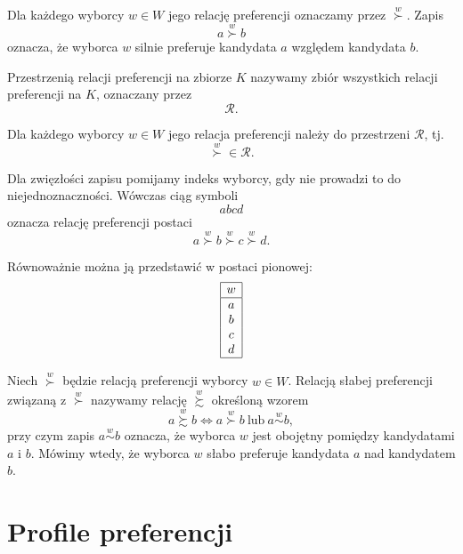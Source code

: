 \documentclass[12pt,a4paper]{mwrep}
\begin{document}
	\begin{definition}
		\label{def:relacja-preferencji-wyborcy}
		Dla każdego wyborcy \(w \in W\) jego relację preferencji oznaczamy przez \(\overset{w}{\succ}\). Zapis
		\[
		a \overset{w}{\succ} b
		\]
		oznacza, że wyborca \(w\) silnie preferuje kandydata \(a\) względem kandydata \(b\).
	\end{definition}
	
	\begin{definition}
		\label{def:przestrzen-relacjo-preferencji}
		Przestrzenią relacji preferencji na zbiorze \(K\) nazywamy zbiór wszystkich relacji preferencji na \(K\), oznaczany przez
		\[
		\mathcal{R}.
		\]
	\end{definition}
	
	Dla każdego wyborcy \(w \in W\) jego relacja preferencji należy do przestrzeni \(\mathcal{R}\), tj.
	\[
	\overset{w}{\succ} \in \mathcal{R}.
	\]
	
	Dla zwięzłości zapisu pomijamy indeks wyborcy, gdy nie prowadzi to do niejednoznaczności. Wówczas ciąg symboli
	\[
	abcd
	\]
	oznacza relację preferencji postaci
	\[
	a \overset{w}{\succ} b \overset{w}{\succ} c \overset{w}{\succ} d.
	\]
	
	Równoważnie można ją przedstawić w postaci pionowej:
	\[
	\begin{array}{|c|}
		\hline
		w\\
		\hline
		a\\
		b\\
		c\\
		d\\
		\hline
	\end{array}
	\]
	
	\begin{definition}
		\label{def:slaba-preferencja}
		Niech \(\overset{w}{\succ}\) będzie relacją preferencji wyborcy \(w \in W\).
		Relacją słabej preferencji związaną z \(\overset{w}{\succ}\) nazywamy relację \(\overset{w}{\succsim}\) określoną wzorem
		\[
		a \overset{w}{\succsim} b
		\iff
		a \overset{w}{\succ} b \ \text{lub}\ a \overset{w}{\sim} b,
		\]
		przy czym zapis \(a \overset{w}{\sim} b\) oznacza, że wyborca \(w\) jest obojętny pomiędzy kandydatami \(a\) i \(b\).
		Mówimy wtedy, że wyborca \(w\) słabo preferuje kandydata \(a\) nad kandydatem \(b\).
	\end{definition}
	
	\section{Profile preferencji}
	
\end{document}
